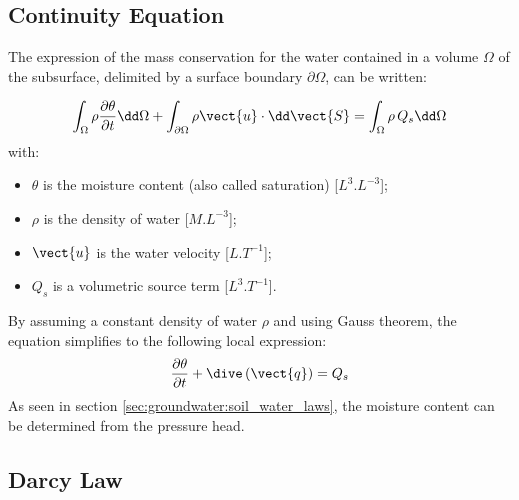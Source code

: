 \subsection{Continuity Equation}

The expression of the mass conservation for the water contained in a volume $\Omega$ of
the subsurface, delimited by a surface boundary $\partial \Omega$,
can be written:

\begin{equation}\label{eq:groundwater:int_mass_cons}
\int_\Omega{\rho \frac{\partial{\theta}}{\partial{t}} \dd \Omega} + \int_{\partial \Omega}{ \rho \vect{u}\cdot  \dd \vect{S}}=
\int_\Omega{\rho\,Q_s \dd \Omega}
\end{equation}
with:
\begin {itemize}
 \item[$\bullet$] $\theta$ is the moisture content (also called saturation) [$L^3.L^{-3}$];
 \item[$\bullet$] $\rho$ is the density of water [$M.L^{-3}$];
 \item[$\bullet$] $\vect{u}$ is the water velocity [$L.T^{-1}$];
 \item[$\bullet$] $Q_s$ is a volumetric source term [$L^3.T^{-1}$].
\end{itemize}

By assuming a constant density of water $\rho$ and using Gauss theorem, the equation simplifies to the following local expression:
\begin{equation}\label{eq:groundwater:mass_cons}
\frac{\partial{\theta}}{\partial{t}} + \dive \left( \vect{q} \right) = Q_s
\end{equation}
As seen in section \ref{sec:groundwater:soil_water_laws}, the moisture content can be determined from the pressure head.

\subsection{Darcy Law}\label{sec:groundwater:darcy_law}

